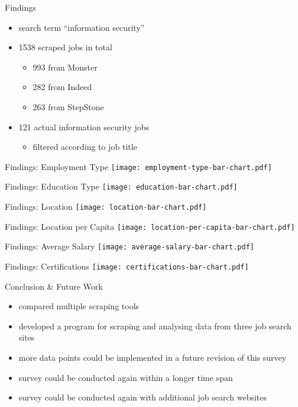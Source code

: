 \documentclass[aspectratio=169]{beamer}
\begin{document}
  \begin{frame}{Findings}
    \begin{itemize}
      \item search term “information security”
      \item 1538 scraped jobs in total
      \begin{itemize}
        \item 993 from Monster
        \item 282 from Indeed
        \item 263 from StepStone
      \end{itemize}
      \item 121 actual information security jobs
        \begin{itemize}
          \item filtered according to job title
        \end{itemize}
    \end{itemize}
  \end{frame}

  \begin{frame}{Findings: Employment Type}
    \texttt{[image: employment-type-bar-chart.pdf]}
  \end{frame}

  \begin{frame}{Findings: Education Type}
    \texttt{[image: education-bar-chart.pdf]}
  \end{frame}

  \begin{frame}{Findings: Location}
    \texttt{[image: location-bar-chart.pdf]}
  \end{frame}

  \begin{frame}{Findings: Location per Capita}
    \texttt{[image: location-per-capita-bar-chart.pdf]}
  \end{frame}

  \begin{frame}{Findings: Average Salary}
    \texttt{[image: average-salary-bar-chart.pdf]}
  \end{frame}

  \begin{frame}{Findings: Certifications}
    \texttt{[image: certifications-bar-chart.pdf]}
  \end{frame}

  \begin{frame}{Conclusion \& Future Work}
    \begin{itemize}
      \item compared multiple scraping tools
      \item developed a program for scraping and analysing data from three job search sites
      \item more data points could be implemented in a future revision of this survey
      \item survey could be conducted again within a longer time span
      \item survey could be conducted again with additional job search websites
    \end{itemize}
  \end{frame}
\end{document}
